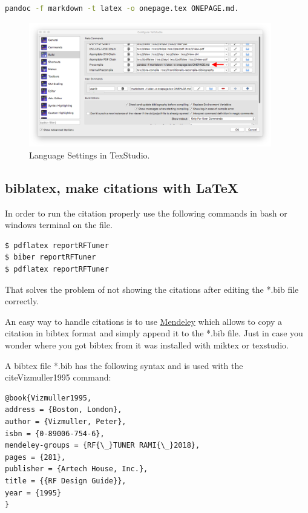 \begin{lstlisting}[language=bash, caption=Terminal command that converts .md to .tex files, label=lst: pandoc_bash_convert_file]
pandoc -f markdown -t latex -o onepage.tex ONEPAGE.md.
\end{lstlisting}

\begin{figure}[H]
	\centering
	\includegraphics[width=400px ]{02_images/texstudio_convertMDfiletoTEXfilewithPandoc}
	\caption{Language Settings in TexStudio.}
	\label{fig: texstudio_convertMDfiletoTEXfilewithPandoc}
\end{figure}

\subsection{biblatex, make citations with \LaTeX}\label{subsec: Bibtex, make citations with LaTeX}
In order to run the citation properly use the following commands in bash or windows terminal on the file.
\begin{verbatim}
$ pdflatex reportRFTuner
$ biber reportRFTuner
$ pdflatex reportRFTuner
\end{verbatim}
That solves the problem of not showing the citations after editing the *.bib file correctly.

An easy way to handle citations is to use \href{https://www.mendeley.com}{Mendeley} which allows to copy a citation in bibtex format and simply append it to the *.bib file. Just in case you wonder where you got bibtex from it was installed with miktex or texstudio. 

A bibtex file *.bib has the following syntax and is used with the \\cite{Vizmuller1995} \cite{Vizmuller1995} command:

\begin{lstlisting}
@book{Vizmuller1995,
address = {Boston, London},
author = {Vizmuller, Peter},
isbn = {0-89006-754-6},
mendeley-groups = {RF{\_}TUNER RAMI{\_}2018},
pages = {281},
publisher = {Artech House, Inc.},
title = {{RF Design Guide}},
year = {1995}
}
\end{lstlisting}

